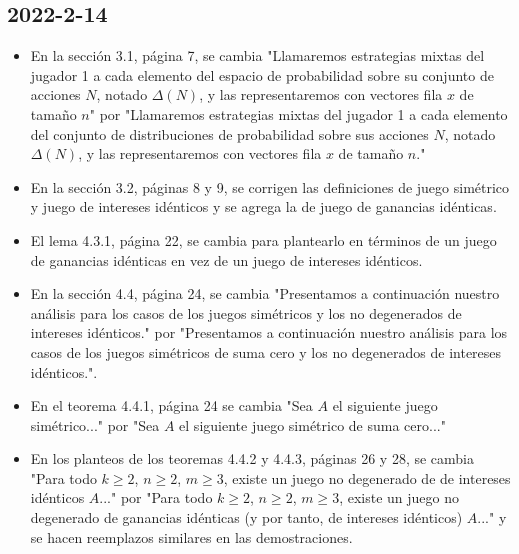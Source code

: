 \documentclass{article}
\begin{document}
\subsection*{2022-2-14}
\begin{itemize}
    \item En la sección 3.1, página 7, se cambia "Llamaremos estrategias mixtas del jugador 1 a cada elemento del espacio de probabilidad sobre su conjunto de acciones $N$, notado $\Delta(N)$, y las representaremos con vectores fila $x$ de tamaño $n$" por "Llamaremos estrategias mixtas del jugador 1 a cada elemento del conjunto de distribuciones de probabilidad sobre sus acciones $N$, notado $\Delta(N)$, y las representaremos con vectores fila $x$ de tamaño $n$."
    \item En la sección 3.2, páginas 8 y 9, se corrigen las definiciones de juego simétrico y juego de intereses idénticos y se agrega la de juego de ganancias idénticas.
    \item El lema 4.3.1, página 22, se cambia para plantearlo en términos de un juego de ganancias idénticas en vez de un juego de intereses idénticos.
    \item En la sección 4.4, página 24, se cambia "Presentamos a continuación nuestro análisis para los casos de los juegos simétricos y los no degenerados de intereses idénticos." por "Presentamos a continuación nuestro análisis para los casos de los juegos simétricos de suma cero y los no degenerados de intereses idénticos.".
    \item En el teorema 4.4.1, página 24 se cambia "Sea $A$ el siguiente juego simétrico..." por "Sea $A$ el siguiente juego simétrico de suma cero..."
    \item En los planteos de los teoremas 4.4.2 y 4.4.3, páginas 26 y 28, se cambia "Para todo $k \geq 2$, $n\geq 2$, $m\geq 3$, existe un juego no degenerado de de intereses idénticos $A$..." por "Para todo $k \geq 2$, $n\geq 2$, $m\geq 3$, existe un juego no degenerado de ganancias idénticas (y por tanto, de intereses idénticos) $A$..." y se hacen reemplazos similares en las demostraciones.
\end{itemize}
\end{document}
